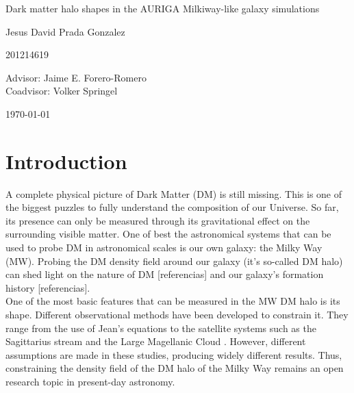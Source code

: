 \documentclass[12pt]{article}
\begin{document}
\begin{center}
\Huge
Dark matter halo shapes in the AURIGA Milkiway-like galaxy simulations

\vspace{3mm}
\Large Jesus David Prada Gonzalez

\large
201214619


\vspace{2mm}
\Large
Advisor: Jaime E. Forero-Romero\\
Coadvisor: Volker Springel
\normalsize
\vspace{2mm}

\today
\end{center}


\normalsize
\section{Introduction}


A complete physical picture of Dark Matter (DM) is still missing.
This is one of the biggest puzzles to fully understand the composition of our Universe.
So far, its presence can only be measured through its gravitational effect on the surrounding visible matter. 
One of best the astronomical systems that can be used to probe DM in astronomical scales is our own galaxy: the Milky Way (MW).
Probing the DM density field around our galaxy (it's so-called DM halo) can shed light on the nature of DM [referencias] and our galaxy's formation history [referencias].\\

One of the most basic features that can be measured in the MW DM halo is its shape. 
Different observational methods have been developed to constrain it. 
They range from the use of Jean's equations \cite{Loebman et al. 2012} to the satellite systems such as the Sagittarius stream and the Large Magellanic Cloud \cite{Vera-Ciro et al  2013, Deg & Widrow 2012, Law & Majewski 2010}. 
However, different assumptions are made in these studies, producing widely different results.
Thus, constraining the density field of the DM halo of the Milky Way remains an open research topic in present-day astronomy.\\ 
\end{document}
